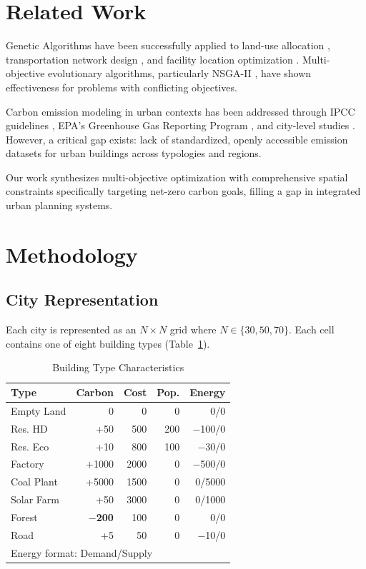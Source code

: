 \documentclass[conference]{IEEEtran}
\begin{document}
\section{Related Work}

Genetic Algorithms have been successfully applied to land-use allocation \cite{Ligmann2008}, transportation network design \cite{Cao2012}, and facility location optimization \cite{Stewart2014}. Multi-objective evolutionary algorithms, particularly NSGA-II \cite{Deb2002}, have shown effectiveness for problems with conflicting objectives.

Carbon emission modeling in urban contexts has been addressed through IPCC guidelines \cite{IPCC2006}, EPA's Greenhouse Gas Reporting Program \cite{EPA2022}, and city-level studies \cite{Kennedy2009}. However, a critical gap exists: lack of standardized, openly accessible emission datasets for urban buildings across typologies and regions.

Our work synthesizes multi-objective optimization with comprehensive spatial constraints specifically targeting net-zero carbon goals, filling a gap in integrated urban planning systems.

\section{Methodology}

\subsection{City Representation}

Each city is represented as an $N \times N$ grid where $N \in \{30, 50, 70\}$. Each cell contains one of eight building types (Table~\ref{tab:buildings}).

\begin{table}[htbp]
\caption{Building Type Characteristics}
\begin{center}
\begin{tabular}{lrrrr}
\toprule
\textbf{Type} & \textbf{Carbon} & \textbf{Cost} & \textbf{Pop.} & \textbf{Energy} \\
\midrule
Empty Land & 0 & 0 & 0 & 0/0 \\
Res. HD & +50 & 500 & 200 & $-$100/0 \\
Res. Eco & +10 & 800 & 100 & $-$30/0 \\
Factory & +1000 & 2000 & 0 & $-$500/0 \\
Coal Plant & +5000 & 1500 & 0 & 0/5000 \\
Solar Farm & +50 & 3000 & 0 & 0/1000 \\
Forest & \textbf{$-$200} & 100 & 0 & 0/0 \\
Road & +5 & 50 & 0 & $-$10/0 \\
\bottomrule
\multicolumn{5}{l}{\footnotesize Energy format: Demand/Supply}
\end{tabular}
\label{tab:buildings}
\end{center}
\end{table}
\end{document}
